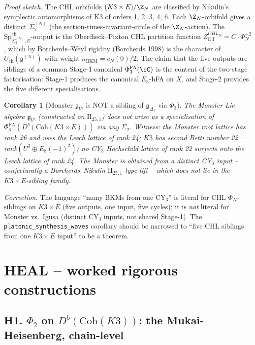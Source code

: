 \documentclass[11pt]{article}
\newtheorem{corollary}[theorem]{Corollary}
\theoremstyle{definition}
\providecommand{\PhiFA}{\Phi^{\mathrm{FA}}}
\providecommand{\SpCh}{\mathrm{Sp}^{\mathrm{ch}}}
\providecommand{\Coh}{\mathrm{Coh}}
\providecommand{\kBKM}{\kappa_{\mathrm{BKM}}}
\begin{document}
\emph{Proof sketch.} The CHL orbifolds
$(K3 \times E)/\Z_N$ are classified by Nikulin's symplectic
automorphisms of K3 of orders 1, 2, 3, 4, 6. Each $\Z_N$-orbifold
gives a distinct $\Sigma_2^{(N)}$ (the section-times-invariant-circle
of the $\Z_N$-action). The $\SpCh_{\Sigma_2^{(N)}, E}$-output is the
Oberdieck--Pixton CHL partition function
$Z^{CHL_N}_{\mathrm{DT}} = C \cdot \Phi_N^{-2}$, which by
Borcherds--Weyl rigidity (Borcherds 1998) is the character of
$U_{\mathrm{ch}}(\mathfrak g^{(N)})$ with weight
$\kBKM = c_N(0)/2$. The claim that the five outputs are siblings of a
common Stage-1 canonical $\PhiFA_3(\cC)$ is the content of the
two-stage factorisation: Stage-1 produces the canonical $E_3$-hFA on
$X$, and Stage-2 provides the five different specialisations.

\begin{corollary}[Monster $\mathfrak g_{V^\natural}$ is NOT a sibling of $\mathfrak g_{\Delta_5}$ via $\Phi_3$]
\label{cor:monster-not-sibling}
The Monster Lie algebra $\mathfrak{g}_{V^\natural}$ (constructed on
$\mathrm{II}_{25,1}$) does \emph{not} arise as a specialisation of
$\PhiFA_3(D^b(\Coh(K3 \times E)))$ via any $\Sigma_2$. Witness: the
Monster root lattice has rank 26 and uses the Leech lattice of rank
24; $K3$ has second Betti number 22 = rank$(U^3 \oplus E_8(-1)^2)$;
no CY$_3$ Hochschild lattice of rank 22 surjects onto the Leech
lattice of rank 24. The Monster is obtained from a distinct CY$_3$
input -- conjecturally a Borcherds--Nikulin $\mathrm{II}_{25,1}$-type
lift -- which does not lie in the $K3 \times E$-sibling family.
\end{corollary}

\emph{Correction.} The language ``many BKMs from one CY$_3$'' is
literal for CHL $\Phi_N$-siblings on $K3 \times E$ (five outputs, one
input, five cycles); it is \emph{not} literal for Monster vs.\
Igusa (distinct CY$_3$ inputs, not shared Stage-1). The
\texttt{platonic\_synthesis\_waves} corollary should be narrowed to
``five CHL siblings from one $K3 \times E$ input'' to be a theorem.

\section*{HEAL -- worked rigorous constructions}

\subsection*{H1. $\Phi_2$ on $D^b(\Coh(K3))$: the Mukai-Heisenberg,
chain-level}
\end{document}
